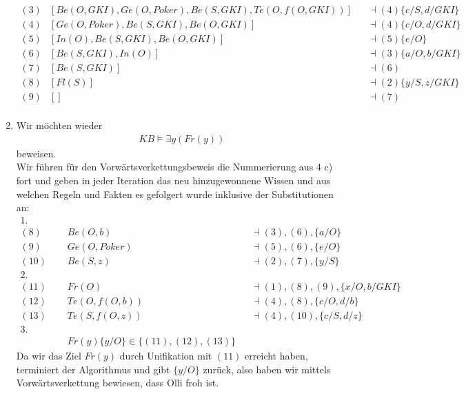 \documentclass[a4paper,10pt]{article}
\begin{document}
\begin{enumerate}[~~a)]
\begin{align*}
(3)&[Be(O,GKI),Ge(O,Poker),Be(S,GKI),Te(O,f(O,GKI))] &&\dashv (4) \{c/S,d/GKI\} \\
(4)&[Ge(O,Poker),Be(S,GKI),Be(O,GKI)] &&\dashv (4) \{c/O,d/GKI\} \\
(5)&[In(O),Be(S,GKI),Be(O,GKI)] &&\dashv (5) \{e/O\} \\
(6)&[Be(S,GKI),In(O)] &&\dashv (3) \{a/O,b/GKI\} \\
(7)&[Be(S,GKI)] &&\dashv (6) \\
(8)&[Fl(S)] &&\dashv (2) \{y/S,z/GKI\} \\
(9)&[] &&\dashv (7) \\
\end{align*}
    \item
    Wir möchten wieder
    \begin{align*}
KB \vDash \exists y (Fr(y))
\end{align*}
	beweisen.\\
    Wir führen für den Vorwärtsverkettungsbeweis die Nummerierung aus 4 c) fort und geben in jeder Iteration das neu hinzugewonnene Wissen und aus welchen Regeln und Fakten es gefolgert wurde inklusive der Substitutionen an:\\
    \begin{align*}
    \text{1. Iteration:}&\\
    (8) &Be(O,b) &&\dashv (3),(6),\{a/O\}\\
    (9) &Ge(O,Poker) &&\dashv (5),(6),\{e/O\}\\
    (10) &Be(S,z) &&\dashv (2),(7),\{y/S\}\\
    \text{2. Iteration:}&\\
    (11) &Fr(O) &&\dashv (1),(8),(9),\{x/O,b/GKI\}\\
    (12) &Te(O,f(O,b)) &&\dashv (4),(8),\{c/O,d/b\}\\
    (13) &Te(S,f(O,z)) &&\dashv (4),(10),\{c/S,d/z\}\\
    \text{3. Iteration:}&\\
    &Fr(y) \{y/O\} \in \{(11),(12),(13)\}
    \end{align*}
    Da wir das Ziel $Fr(y)$ durch Unifikation mit $(11)$ erreicht haben, terminiert der Algorithmus und gibt $\{y/O\}$ zurück, also haben wir mittels Vorwärtsverkettung bewiesen, dass Olli froh ist.
\end{enumerate}
\end{document}
